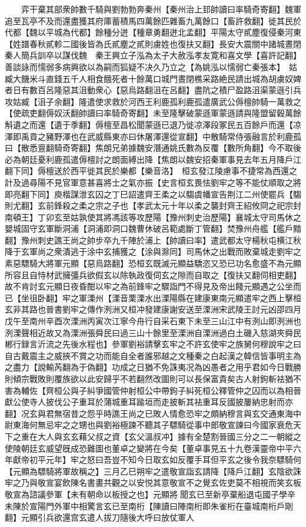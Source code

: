 　　弈干棄其部衆帥數千騎與劉勃勃奔秦州【秦州治上邽帥讀曰率騎奇寄翻】魏軍追至瓦亭不及而還盡獲其府庫蓄積馬四萬餘匹雜畜九萬餘口【畜許救翻】徙其民於代都【魏以平城為代都】餘種分迸【種章勇翻迸北孟翻】平陽太守貳塵復侵秦河東【姓譜春秋貳軫二國後皆為氏貳塵之貳則虜姓也復扶又翻】長安大震關中諸城晝閉秦人簡兵訓卒以謀伐魏　秦王興立子泓為太子大赦泓孝友寛和喜文學【喜許記翻】善談詠而懦弱多病興欲以為嗣而狐疑不决久乃立之【為姚泓以懦弱亡秦張本】　姑臧大饑米斗直錢五千人相食餓死者十餘萬口城門晝閉樵采路絶民請出城為胡虜奴婢者日有數百呂隆惡其沮動衆心【惡烏路翻沮在呂翻】盡阬之積尸盈路沮渠蒙遜引兵攻姑臧【沮子余翻】隆遣使求救於河西王利鹿孤利鹿孤遣廣武公傉檀帥騎一萬救之【使疏吏翻傉奴沃翻帥讀曰率騎奇寄翻】未至隆擊破蒙遜軍蒙遜請與隆盟留穀萬餘斛遺之而還【遺于季翻】傉檀至昌松聞蒙遜已退乃徙凉澤段冢民五百餘戶而還【凉澤即禹貢之豬野澤也在武威縣東亦曰休屠澤還從宣翻】中散騎常侍張融言於利鹿孤曰【散悉亶翻騎奇寄翻】焦朗兄弟據魏安潛通姚氏數為反覆【數所角翻】今不取後必為朝廷憂利鹿孤遣傉檀討之朗面縛出降【焦朗以魏安招秦軍事見去年五月降戶江翻下同】傉檀送於西平徙其民於樂都【樂音洛】　桓玄發江陵慮事不捷常為西還之計及過尋陽不見官軍意甚喜將士之氣亦振【史言桓玄畏怯劉牢之等不能仗順取之將即亮翻下同】庾楷謀泄玄囚之丁巳詔遣齊王柔之以騶虞幡宣告荆江二州使罷兵【騶則尤翻】玄前鋒殺之柔之宗之子也【孝武太元十年以柔之襲封齊王紹攸冏之祀宗封南頓王】丁卯玄至姑孰使其將馮該等攻歷陽【豫州刺史治歷陽】襄城太守司馬休之嬰城固守玄軍斷洞浦【洞浦即洞口魏曹休破呂範處斷丁管翻】焚豫州舟艦【艦戶黯翻】豫州刺史譙王尚之帥步卒九千陣於浦上【帥讀曰率】遣武都太守楊秋屯横江秋降于玄軍尚之衆潰逃于涂中玄捕獲之【涂與滁同】司馬休之出戰而敗棄城走劉牢之素惡驃騎大將軍元顯【惡烏路翻】恐桓玄既滅元顯益驕恣又恐已功名愈盛不為元顯所容且自恃材武擁彊兵欲假玄以除執政復伺玄之隙而自取之【復扶又翻伺相吏翻】故不肯討玄元顯日夜昏酣以牢之為前鋒牢之驟詣門不得見及帝出餞元顯遇之公坐而已【坐徂卧翻】牢之軍溧州【溧音栗溧水出溧陽縣在建康東南元顯遣牢之西上擊桓玄非其路也晉書劉牢之傳作洌洲又桓冲發建康謝安送至溧洲宋武陵王討元凶邵四月戊午至南州辛酉次溧洲丙寅次江寧今舟行自采石東下未至三山江中有洌山即洌洲也洌溧聲相近故又為溧洲張舜民曰過三山十餘里至溧洲自溧洲過白土磯入慈湖夾舜民郴行録言沂流之先後水程也】參軍劉裕請擊玄牢之不許玄使牢之族舅何穆說牢之曰自古戴震主之威挾不賞之功而能自全者誰邪越之文種秦之白起漢之韓信皆事明主為之盡力【說輸芮翻為于偽翻】功成之日猶不免誅夷况為凶愚者之用乎君如今日戰勝則傾宗戰敗則覆族欲以此安歸乎不若翻然改圖則可以長保富貴矣古人射鉤斬袪猶不害為輔佐【齊桓公與子糾爭國管仲射桓公中帶鉤子糾死桓公釋管仲之囚而以為相晉獻公使寺人披伐公子重耳於蒲城重耳踰垣而走披斬其袪重耳反國披屢納忠射而亦翻】况玄與君無宿昔之怨乎時譙王尚之已敗人情愈恐牢之頗納穆言與玄交通東海中尉東海何無忌牢之之甥也與劉裕極諫不聽其子驃騎從事中郎敬宣諫曰今國家衰危天下之重在大人與玄玄藉父叔之資【玄父溫叔冲】據有全楚割晉國三分之二一朝縱之使陵朝廷玄威望旣成恐難圖也董卓之變將在今矣【董卓事見五十九卷漢靈帝中平六年獻帝初平元年】牢之怒曰吾豈不知今日取玄如反覆手耳但平玄之後令我奈驃騎何【元顯為驃騎將軍故稱之】三月乙巳朔牢之遣敬宣詣玄請降【降戶江翻】玄陰欲誅牢之乃與敬宣宴飲陳名書畫共觀之以安悦其意敬宣不之覺玄佐吏莫不相視而笑玄板敬宣為諮議參軍【未有朝命以板授之也】元顯將聞玄已至新亭棄船退屯國子學辛未陳於宣陽門外軍中相驚言玄已至南桁【陳讀曰陣南桁即朱雀桁在臺城南桁戶剛翻】元顯引兵欲還宫玄遣人拔刀隨後大呼曰放仗軍人